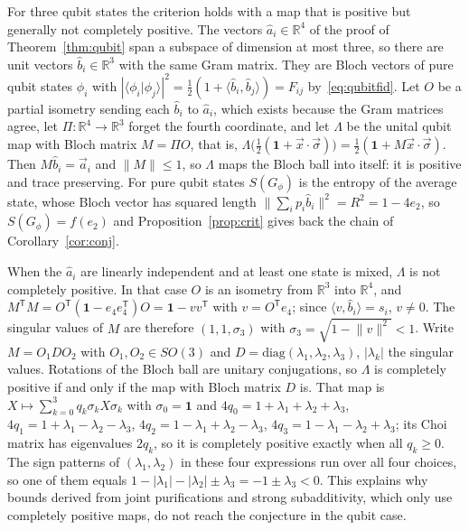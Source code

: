 \documentclass[11pt,a4paper]{article}
\theoremstyle{definition}
\theoremstyle{plain}
\newcommand{\braket}[2]{\langle#1\vert#2\rangle}
\newcommand{\norm}[1]{\lVert#1\rVert}
\newcommand{\one}{\mathbf{1}}
\newcommand{\R}{\mathbb{R}}
\newcommand{\T}{\mathsf{T}}
\begin{document}
For three qubit states the criterion holds with a map that is positive but
generally not completely positive. The vectors $\hat a_i\in\R^4$ of the proof of
Theorem~\ref{thm:qubit} span a subspace of dimension at most three, so there
are unit vectors $\hat b_i\in\R^3$ with the same Gram matrix. They are Bloch
vectors of pure qubit states $\phi_i$ with
$|\braket{\phi_i}{\phi_j}|^2=\tfrac12(1+\langle\hat b_i,\hat b_j\rangle)=F_{ij}$
by~\eqref{eq:qubitfid}. Let $O$ be a partial isometry sending each $\hat b_i$
to $\hat a_i$, which exists because the Gram matrices agree, let
$\Pi:\R^4\to\R^3$ forget the fourth coordinate, and let $\Lambda$ be the unital
qubit map with Bloch matrix $M=\Pi O$, that is,
$\Lambda\bigl(\tfrac12(\one+\vec x\cdot\vec\sigma)\bigr)=\tfrac12(\one+M\vec x\cdot\vec\sigma)$.
Then $M\hat b_i=\vec a_i$ and $\norm{M}\le1$, so $\Lambda$ maps the Bloch ball into
itself: it is positive and trace preserving. For pure qubit states $S(G_\phi)$
is the entropy of the average state, whose Bloch vector has squared length
$\|\sum_ip_i\hat b_i\|^2=R^2=1-4e_2$, so $S(G_\phi)=f(e_2)$ and
Proposition~\ref{prop:crit} gives back the chain of Corollary~\ref{cor:conj}.

When the $\hat a_i$ are linearly independent and at least one state is mixed,
$\Lambda$ is not completely positive. In that case $O$ is an isometry from
$\R^3$ into $\R^4$, and $M^\T M=O^\T(\one-e_4e_4^\T)O=\one-vv^\T$ with
$v=O^\T e_4$; since $\langle v,\hat b_i\rangle=s_i$, $v\ne0$. The singular
values of $M$ are therefore $(1,1,\sigma_3)$ with
$\sigma_3=\sqrt{1-\norm v^2}<1$. Write $M=O_1DO_2$ with $O_1,O_2\in SO(3)$ and
$D=\mathrm{diag}(\lambda_1,\lambda_2,\lambda_3)$, $|\lambda_k|$ the singular
values. Rotations of the Bloch ball are unitary conjugations, so $\Lambda$ is
completely positive if and only if the map with Bloch matrix $D$ is. That map
is $X\mapsto\sum_{k=0}^3q_k\sigma_kX\sigma_k$ with $\sigma_0=\one$ and
$4q_0=1+\lambda_1+\lambda_2+\lambda_3$,
$4q_1=1+\lambda_1-\lambda_2-\lambda_3$,
$4q_2=1-\lambda_1+\lambda_2-\lambda_3$,
$4q_3=1-\lambda_1-\lambda_2+\lambda_3$; its Choi matrix has eigenvalues
$2q_k$, so it is completely positive exactly when all $q_k\ge0$. The sign
patterns of $(\lambda_1,\lambda_2)$ in these four expressions run over all four
choices, so one of them equals $1-|\lambda_1|-|\lambda_2|\pm\lambda_3=-1\pm\lambda_3<0$.
This explains why bounds derived from joint purifications and strong
subadditivity, which only use completely positive maps, do not reach the
conjecture in the qubit case.
\end{document}
